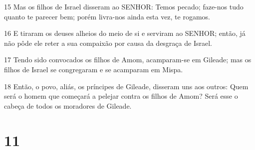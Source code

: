 \par 15 Mas os filhos de Israel disseram ao SENHOR: Temos pecado; faze-nos tudo quanto te parecer bem; porém livra-nos ainda esta vez, te rogamos.
\par 16 E tiraram os deuses alheios do meio de si e serviram ao SENHOR; então, já não pôde ele reter a sua compaixão por causa da desgraça de Israel.
\par 17 Tendo sido convocados os filhos de Amom, acamparam-se em Gileade; mas os filhos de Israel se congregaram e se acamparam em Mispa.
\par 18 Então, o povo, aliás, os príncipes de Gileade, disseram uns aos outros: Quem será o homem que começará a pelejar contra os filhos de Amom? Será esse o cabeça de todos os moradores de Gileade.

\chapter{11}

